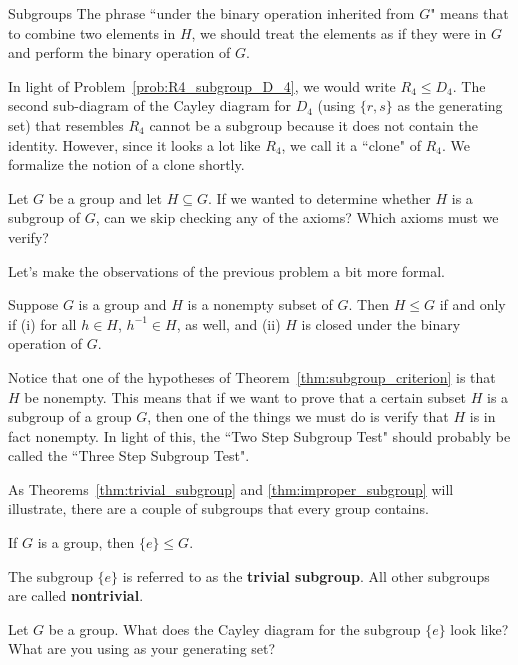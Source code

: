\begin{section}{Subgroups}
The phrase ``under the binary operation inherited from $G$" means that to combine two elements in $H$, we should treat the elements as if they were in $G$ and perform the binary operation of $G$.

In light of Problem~\ref{prob:R4_subgroup_D_4}, we would write $R_4\leq D_4$.  The second sub-diagram of the Cayley diagram for $D_4$ (using $\{r,s\}$ as the generating set) that resembles $R_4$ cannot be a subgroup because it does not contain the identity.  However, since it looks a lot like $R_4$, we call it a ``clone" of $R_4$. We formalize the notion of a clone shortly.

\begin{problem}\label{prob:informal_subgroup_criterion}
Let $G$ be a group and let $H\subseteq G$. If we wanted to determine whether $H$ is a subgroup of $G$, can we skip checking any of the axioms? Which axioms must we verify?
\end{problem}

Let's make the observations of the previous problem a bit more formal.

\begin{theorem}\label{thm:subgroup_criterion}
Suppose $G$ is a group and $H$ is a nonempty subset of $G$.  Then $H\leq G$ if and only if (i) for all $h\in H$, $h^{-1} \in H$, as well, and (ii) $H$ is closed under the binary operation of $G$.
\end{theorem}

Notice that one of the hypotheses of Theorem~\ref{thm:subgroup_criterion} is that $H$ be nonempty.  This means that if we want to prove that a certain subset $H$ is a subgroup of a group $G$, then one of the things we must do is verify that $H$ is in fact nonempty. In light of this, the ``Two Step Subgroup Test" should probably be called the ``Three Step Subgroup Test".

As Theorems~\ref{thm:trivial_subgroup} and \ref{thm:improper_subgroup} will illustrate, there are a couple of subgroups that every group contains.

\begin{theorem}\label{thm:trivial_subgroup}
If $G$ is a group, then $\{e\}\leq G$.
\end{theorem}

The subgroup $\{e\}$ is referred to as the \textbf{trivial subgroup}.  All other subgroups are called \textbf{nontrivial}.

\begin{problem}
Let $G$ be a group. What does the Cayley diagram for the subgroup $\{e\}$ look like? What are you using as your generating set?
\end{problem}


\end{section}
